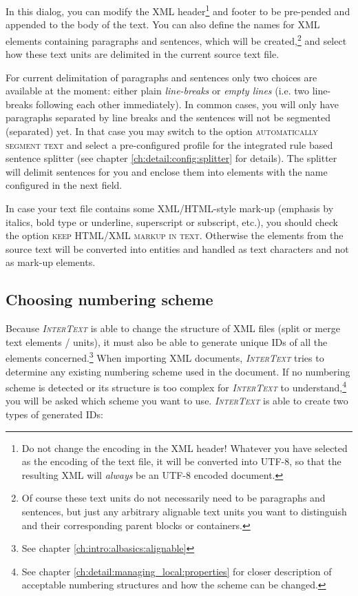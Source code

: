 \documentclass[a4paper,10pt,oneside]{book}
\newcommand{\IT}{\textit{\textsc{InterText}}\xspace}
\newcommand{\menu}[1]{\textsc{#1}}
\begin{document}
In this dialog, you can modify the XML header\footnote{Do not change the encoding in the XML header! Whatever you have selected as the encoding of the text file, it will be converted into UTF-8, so that the resulting XML will \emph{always} be an UTF-8 encoded document.} and footer to be pre-pended and appended to the body of the text. You can also define the names for XML elements containing paragraphs and sentences, which will be created,\footnote{Of course these text units do not necessarily need to be paragraphs and sentences, but just any arbitrary alignable text units you want to distinguish and their corresponding parent blocks or containers.} and select how these text units are delimited in the current source text file.

For current delimitation of paragraphs and sentences only two choices are available at the moment: either plain \emph{line-breaks} or \emph{empty lines} (i.e. two line-breaks following each other immediately). In common cases, you will only have paragraphs separated by line breaks and the sentences will not be segmented (separated) yet. In that case you may switch to the option \menu{automatically segment text} and select a pre-configured profile for the integrated rule based sentence splitter (see chapter \ref{ch:detail:config:splitter} for details). The splitter will delimit sentences for you and enclose them into elements with the name configured in the next field.

In case your text file contains some XML/HTML-style mark-up (emphasis by italics, bold type or underline, superscript or subscript, etc.), you should check the option \menu{keep HTML/XML markup in text}. Otherwise the elements from the source text will be converted into entities and handled as text characters and not as mark-up elements.

\subsection{Choosing numbering scheme}\label{ch:detail:managing_local:new:numbering}

Because \IT is able to change the structure of XML files (split or merge text elements / units), it must also be able to generate unique IDs of all the elements concerned.\footnote{See chapter \ref{ch:intro:albasics:alignable}} When importing XML documents, \IT tries to determine any existing numbering scheme used in the document. If no numbering scheme is detected or its structure is too complex for \IT to understand,\footnote{See chapter \ref{ch:detail:managing_local:properties} for closer description of acceptable numbering structures and how the scheme can be changed.} you will be asked which scheme you want to use. \IT is able to create two types of generated IDs:
\end{document}
